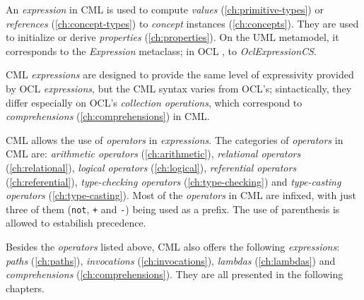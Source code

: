 An \emph{expression} in CML is used to compute
\emph{values} (\ref{ch:primitive-types})
or \emph{references} (\ref{ch:concept-types})
to \emph{concept} instances (\ref{ch:concepts}).
They are used to initialize or derive \emph{properties} (\ref{ch:properties}).
On the UML \cite{uml} metamodel,
it corresponds to the \emph{Expression} metaclass;
in OCL \cite{ocl}, to \emph{OclExpressionCS}.

CML \emph{expressions} are designed to provide the same level of
expressivity provided by OCL \emph{expressions},
but the CML syntax varies from OCL's;
sintactically, they differ especially on OCL's \emph{collection operations},
which correspond to \emph{comprehensions} (\ref{ch:comprehensions}) in CML.

CML allows the use of \emph{operators} in \emph{expressions}.
The categories of \emph{operators} in CML are:
\emph{arithmetic operators} (\ref{ch:arithmetic}),
\emph{relational operators} (\ref{ch:relational}),
\emph{logical operators} (\ref{ch:logical}),
\emph{referential operators} (\ref{ch:referential}),
\emph{type-checking operators} (\ref{ch:type-checking}) and
\emph{type-casting operators} (\ref{ch:type-casting}).
Most of the \emph{operators} in CML are infixed,
with just three of them (\verb|not|, \verb|+| and \verb|-|) being used as a prefix.
The use of parenthesis is allowed to estabilish precedence.

Besides the \emph{operators} listed above,
CML also offers the following \emph{expressions}:
\emph{paths} (\ref{ch:paths}),
\emph{invocations} (\ref{ch:invocations}),
\emph{lambdas} (\ref{ch:lambdas})
and \emph{comprehensions} (\ref{ch:comprehensions}).
They are all presented in the following chapters.
